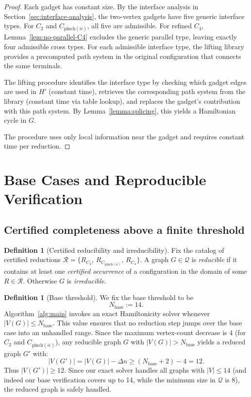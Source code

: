 \documentclass[12pt]{article}
\theoremstyle{definition}
\newtheorem{definition}[theorem]{Definition}
\begin{document}
\begin{proof}
Each gadget has constant size. By the interface analysis in Section~\ref{sec:interface-analysis}, the two-vertex gadgets have five generic interface types. For $C_2$ and $C_{\mathrm{pinch}(ii)}$, all five are admissible. For refined $C_4$, Lemma~\ref{lem:no-parallel-C4} excludes the generic parallel type, leaving exactly four admissible cross types. For each admissible interface type, the lifting library provides a precomputed path system in the original configuration that connects the same terminals. 

The lifting procedure identifies the interface type by checking which gadget edges are used in $H'$ (constant time), retrieves the corresponding path system from the library (constant time via table lookup), and replaces the gadget's contribution with this path system. By Lemma~\ref{lemma:splicing}, this yields a Hamiltonian cycle in $G$.

The procedure uses only local information near the gadget and requires constant time per reduction.
\end{proof}

\section{Base Cases and Reproducible Verification}
\label{sec:base-cases}

\subsection{Certified completeness above a finite threshold}

\begin{definition}[Certified reducibility and irreducibility]
\label{def:cert}
Fix the catalog of certified reductions
$\mathcal R=\{R_{C_2},\,R_{C_{\mathrm{pinch}(ii)}},\,R_{C_4}\}$.
A graph $G\in\mathcal Q$ is \emph{reducible} if it contains at least one
\emph{certified occurrence} of a configuration in the domain of some $R\in\mathcal R$.
Otherwise $G$ is \emph{irreducible}.
\end{definition}

\begin{definition}[Base threshold]
\label{def:Nbase}
We fix the base threshold to be
\[
N_{\mathrm{base}} := 14.
\]
Algorithm~\ref{alg:main} invokes an exact Hamiltonicity solver whenever $|V(G)|\le N_{\mathrm{base}}$.
This value ensures that no reduction step jumps over the base case into an unhandled range.
Since the maximum vertex-count decrease is 4 (for $C_2$ and $C_{\text{pinch}(ii)}$), any reducible graph $G$ with $|V(G)| > N_{\mathrm{base}}$ yields a reduced graph $G'$ with:
\[
|V(G')| = |V(G)| - \Delta n \ge (N_{\mathrm{base}} + 2) - 4 = 12.
\]
Thus $|V(G')| \ge 12$. Since our exact solver handles all graphs with $|V| \le 14$ (and indeed our base verification covers up to 14, while the minimum size in $\mathcal{Q}$ is 8), the reduced graph is safely handled.
\end{definition}
\end{document}

